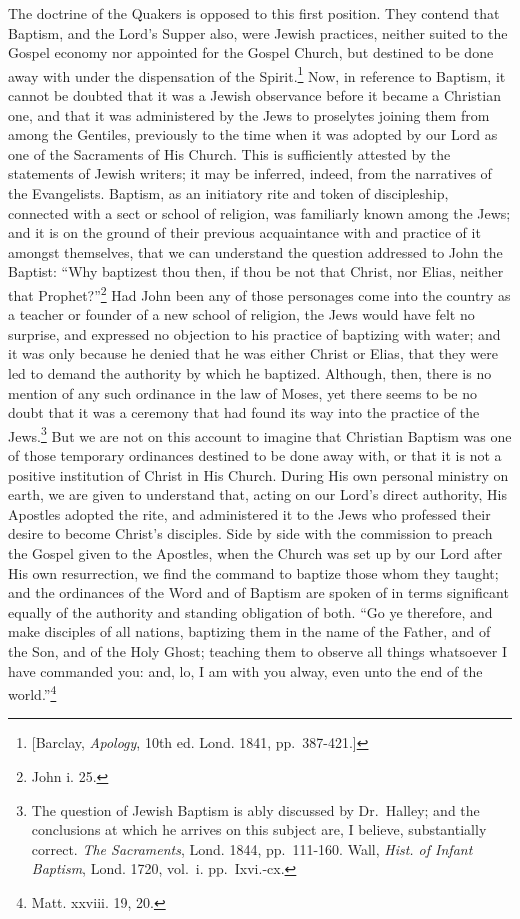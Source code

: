 \documentclass[]{book}
\begin{document}
The doctrine of the Quakers is opposed to this first position. They contend that Baptism, and the Lord's Supper also, were Jewish practices, neither suited to the Gospel economy nor appointed for the Gospel Church, but destined to be done away with under the dispensation of the Spirit.\footnote{{[}Barclay, \emph{Apology}, 10th ed. Lond. 1841, pp.~387-421.{]}} Now, in reference to Baptism, it cannot be doubted that it was a Jewish observance before it became a Christian one, and that it was administered by the Jews to proselytes joining them from among the Gentiles, previously to the time when it was adopted by our Lord as one of the Sacraments of His Church. This is sufficiently attested by the statements of Jewish writers; it may be inferred, indeed, from the narratives of the Evangelists. Baptism, as an initiatory rite and token of discipleship, connected with a sect or school of religion, was familiarly known among the Jews; and it is on the ground of their previous acquaintance with and practice of it amongst themselves, that we can understand the question addressed to John the Baptist: ``Why baptizest thou then, if thou be not that Christ, nor Elias, neither that Prophet?''\footnote{John i. 25.} Had John been any of those personages come into the country as a teacher or founder of a new school of religion, the Jews would have felt no surprise, and expressed no objection to his practice of baptizing with water; and it was only because he denied that he was either Christ or Elias, that they were led to demand the authority by which he baptized. Although, then, there is no mention of any such ordinance in the law of Moses, yet there seems to be no doubt that it was a ceremony that had found its way into the practice of the Jews.\footnote{The question of Jewish Baptism is ably discussed by Dr.~Halley; and the conclusions at which he arrives on this subject are, I believe, substantially correct. \emph{The Sacraments}, Lond. 1844, pp.~111-160. Wall, \emph{Hist. of Infant Baptism}, Lond. 1720, vol.~i. pp.~Ixvi.-cx.} But we are not on this account to imagine that Christian Baptism was one of those temporary ordinances destined to be done away with, or that it is not a positive institution of Christ in His Church. During His own personal ministry on earth, we are given to understand that, acting on our Lord's direct authority, His Apostles adopted the rite, and administered it to the Jews who professed their desire to become Christ's disciples. Side by side with the commission to preach the Gospel given to the Apostles, when the Church was set up by our Lord after His own resurrection, we find the command to baptize those whom they taught; and the ordinances of the Word and of Baptism are spoken of in terms significant equally of the authority and standing obligation of both. ``Go ye therefore, and make disciples of all nations, baptizing them in the name of the Father, and of the Son, and of the Holy Ghost; teaching them to observe all things whatsoever I have commanded you: and, lo, I am with you alway, even unto the end of the world.''\footnote{Matt. xxviii. 19, 20.}
\end{document}
